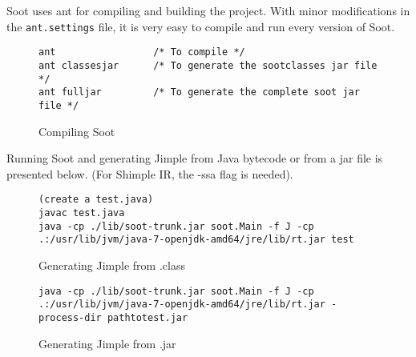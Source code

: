\documentclass{dithesis}
\begin{document}
    Soot uses ant \cite{Apache Ant} for compiling and building the project. With minor modifications in the \texttt{ant.settings} file, it is very easy to compile and run every version of Soot.

    \begin{figure}[H]
\begin{lstlisting}
ant                 /* To compile */
ant classesjar      /* To generate the sootclasses jar file */
ant fulljar         /* To generate the complete soot jar file */
\end{lstlisting}
        \caption{Compiling Soot}
        \end{figure}

        Running Soot and generating Jimple from Java bytecode or from a jar file is presented below. (For Shimple IR, the -ssa flag is needed).
        \begin{figure}[H]
\begin{lstlisting}
(create a test.java)
javac test.java
java -cp ./lib/soot-trunk.jar soot.Main -f J -cp .:/usr/lib/jvm/java-7-openjdk-amd64/jre/lib/rt.jar test
\end{lstlisting}
        \caption{Generating Jimple from .class}
        \end{figure}

        \begin{figure}[H]
\begin{lstlisting}
java -cp ./lib/soot-trunk.jar soot.Main -f J -cp .:/usr/lib/jvm/java-7-openjdk-amd64/jre/lib/rt.jar -process-dir pathtotest.jar
\end{lstlisting}
        \caption{Generating Jimple from .jar}
        \end{figure}
\end{document}
